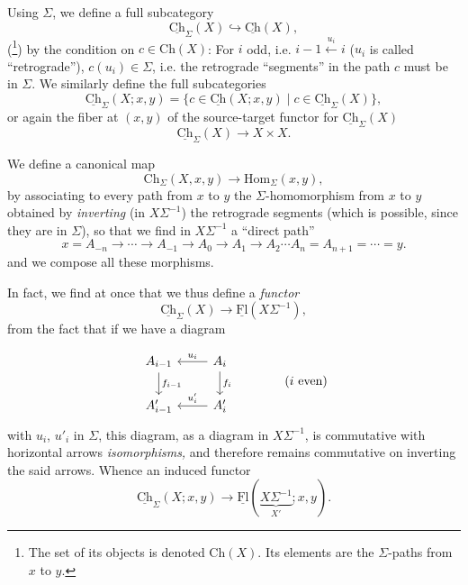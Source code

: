 \documentclass[11pt]{article}
\newcommand{\printedpage}[1]{\marginpar{\footnotesize p.~#1}}
\newcommand{\msp}[1]{\marginpar{\footnotesize [#1]}}
\newcommand{\uCh}{\underline{\mathrm{Ch}}}
\newcommand{\uFl}{\underline{\mathrm{Fl}}}
\newcommand{\Hom}{\mathrm{Hom}}
\begin{document}
Using $\Sigma$, we define a full subcategory
\[
\uCh_\Sigma(X)\hookrightarrow\uCh(X),
\]
(\footnote[3]{The set of its objects is denoted $\mathrm{Ch}(X)$. Its elements are the $\Sigma$-paths from $x$ to $y$.}) by the condition on $c\in\mathrm{Ch}(X)$: For $i$ odd, i.e. $i-1\xleftarrow{u_i}i$ ($u_i$ is called ``retrograde''), $c(u_i)\in\Sigma$, i.e. the retrograde ``segments'' in the path $c$ must be in $\Sigma$. We similarly define the full subcategories
\[
\uCh_\Sigma(X;x,y)=\{c\in\uCh(X;x,y)\mid c\in\uCh_\Sigma(X)\},
\]
or again the fiber at $(x,y)$ of the source-target functor for $\uCh_\Sigma(X)$
\[
\uCh_\Sigma(X)\longrightarrow X\times X.
\]

We define a canonical map
\[
\mathrm{Ch}_\Sigma(X,x,y)\longrightarrow\Hom_\Sigma(x,y),
\]
\msp{page 7}
by associating to every path from $x$ to $y$ the $\Sigma$-homomorphism from $x$ to $y$ obtained by \textit{inverting} (in $X\Sigma^{-1}$) the retrograde segments (which is possible, since they are in $\Sigma$), so that we find in $X\Sigma^{-1}$ a ``direct path'' %
\[
x=A_{-n}\longrightarrow\cdots\longrightarrow A_{-1}\longrightarrow A_0\longrightarrow A_1\longrightarrow A_2\cdots A_n=A_{n+1}=\cdots=y.
\]
and we compose all these morphisms.

In fact, we find at once that we thus define a \textit{functor}
\[
\uCh_\Sigma(X)\longrightarrow\uFl(X\Sigma^{-1}),
\]
 from the fact that if we have a diagram

\printedpage{6}
\[
\begin{tikzcd}
A_{i-1} \arrow[d, "f_{i-1}"] & A_i \arrow[l, "u_i"'] \arrow[d, "f_i"] \\
A'_{i-1} & A'_i \arrow[l, "u'_i"']
\end{tikzcd}
\qquad\qquad (i\text{ even})
\]
with $u_i$, $u'_i$ in $\Sigma$, this diagram, as a diagram in $X\Sigma^{-1}$, is commutative with horizontal arrows \textit{isomorphisms,} and therefore remains commutative on inverting the said arrows. Whence an induced functor
\[
\uCh_\Sigma(X;x,y)\longrightarrow\uFl(\underbrace{X\Sigma^{-1}}_{X'};x,y).
\]
\end{document}
